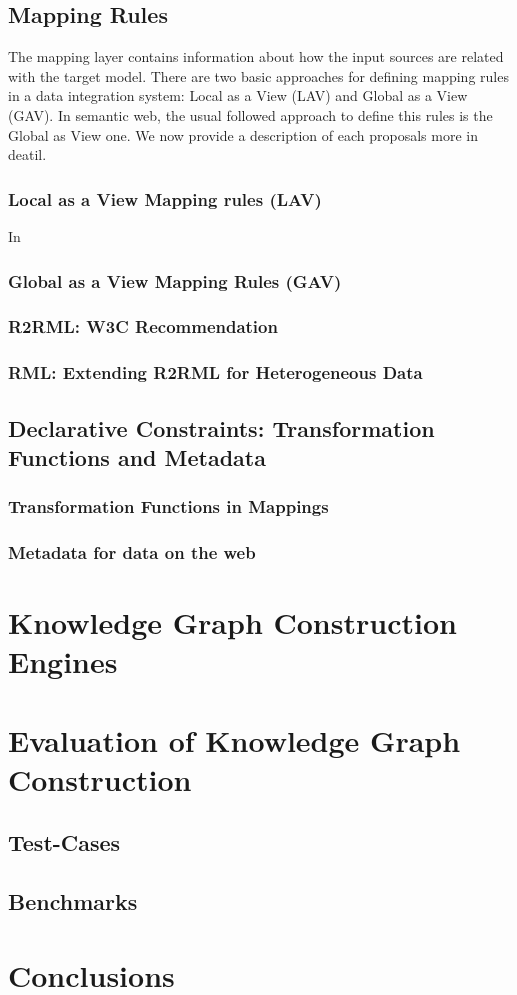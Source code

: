 \subsection{Mapping Rules}
The mapping layer contains information about how the input sources are related with the target model. There are two basic approaches for defining mapping rules in a data integration system: Local as a View (LAV) and Global as a View (GAV). In semantic web, the usual followed approach to define this rules is the Global as View one. We now provide a description of each proposals more in deatil.

\subsubsection{Local as a View Mapping rules (LAV)}
In \citep{ullman1997information}

\subsubsection{Global as a View Mapping Rules (GAV)}


\subsubsection{R2RML: W3C Recommendation}

\subsubsection{RML: Extending R2RML for Heterogeneous Data}

\subsection{Declarative Constraints: Transformation Functions and Metadata}

\subsubsection{Transformation Functions in Mappings}

\subsubsection{Metadata for data on the web}


\section{Knowledge Graph Construction Engines}

\section{Evaluation of Knowledge Graph Construction}

\subsection{Test-Cases}
\subsection{Benchmarks}



\section{Conclusions}
